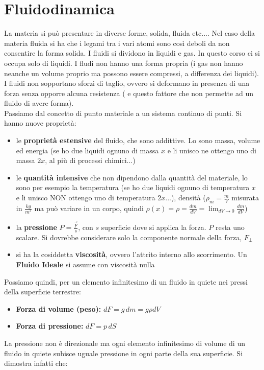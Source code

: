 \documentclass[a4paper,12pt, oneside]{book}
\begin{document}
\chapter{Fluidodinamica}
La materia si può presentare in diverse forme, solida, fluida etc.... Nel caso della materia fluida si ha che i legami tra i vari atomi sono così deboli da non consentire la forma solida. I fluidi si dividono in liquidi e gas. In questo corso ci si occupa solo di liquidi. I fludi non hanno una forma propria (i gas non hanno neanche un volume proprio ma possono essere compressi, a differenza dei liquidi). I fluidi non sopportano sforzi di taglio, ovvero si deformano in presenza di una forza senza opporre alcuna resistenza ( e questo fattore che non permette ad un fluido di avere forma). \\
Passiamo dal concetto di punto materiale a un sistema continuo di punti. Si hanno nuove proprietà:
\begin{itemize}
\item le \textbf{proprietà estensive} del fluido, che sono addittive. Lo sono massa, volume ed energia (se ho due liquidi ognuno di massa $x$ e li unisco ne ottengo uno di massa $2x$, al più di processi chimici...)
\item le \textbf{quantità intensive} che non dipendono dalla quantità del materiale, lo sono per esempio la temperatura (se ho due liquidi ognuno di temperatura $x$ e li unisco NON ottengo uno di temperatura $2x$...), densità ($\rho_m=\frac{m}{V}$ misurata in $\frac{kg}{m^3}$ ma può variare in un corpo, quindi $\rho(x)=\rho=\frac{dm}{dV}=\lim_{dV\to 0}\frac{dm}{dV}$)
\item la \textbf{pressione} $P=\frac{\vec{F}}{s}$, con $s$ superficie dove si applica la forza. $P$ resta uno scalare. Si dovrebbe considerare solo la componente normale della forza, $F_{\perp}$
\item si ha la cosiddetta \textbf{viscosità}, ovvero l'attrito interno allo scorrimento. Un \textbf{Fluido Ideale} si assume con viscosità nulla
\end{itemize}
Possiamo quindi, per un elemento infinitesimo di un fluido in quiete nei pressi della superficie terrestre:
\begin{itemize}
\item \textbf{Forza di volume (peso):} $dF=g\,dm=g\rho dV$
\item \textbf{Forza di pressione:} $dF= p\, dS$
\end{itemize} 
La pressione non è direzionale ma ogni elemento infinitesimo di volume di un fluido in quiete subisce uguale pressione in ogni parte della sua superficie. Si dimostra infatti che:
\end{document}
